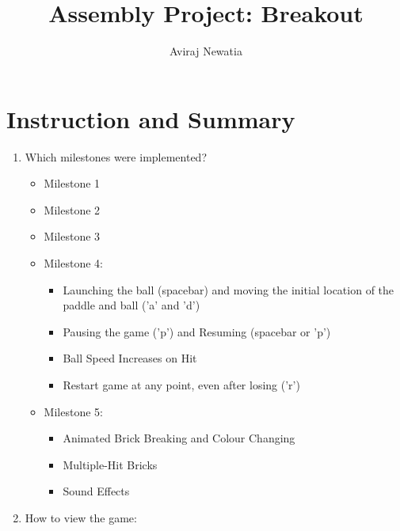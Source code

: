 \documentclass{article}
\title{Assembly Project: Breakout}
\author{Aviraj Newatia}
\begin{document}
\maketitle

\section{Instruction and Summary}

\begin{enumerate}

    \item Which milestones were implemented? 
    \begin{itemize}
    \item   Milestone 1
    \item   Milestone 2
    \item   Milestone 3
    \item   Milestone 4:
    \begin{itemize}
        \item Launching the ball (spacebar) and moving the initial location of the paddle and ball ('a' and 'd')
        \item Pausing the game ('p') and Resuming (spacebar or 'p')
        \item Ball Speed Increases on Hit
        \item Restart game at any point, even after losing ('r')
    \end{itemize}
    \item Milestone 5:
    \begin{itemize}
        \item Animated Brick Breaking and Colour Changing
        \item Multiple-Hit Bricks
        \item Sound Effects
    \end{itemize}
    \end{itemize}

    \item How to view the game:
    
    \begin{enumerate}


\end{enumerate}
\end{enumerate}
\end{document}
